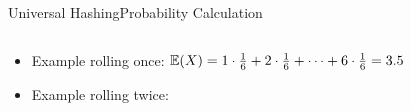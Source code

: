 \begin{frame}{Universal Hashing}{Probability Calculation}
\begin{columns}
\begin{column}{0.5\linewidth}
\begin{table}[!h]
   \end{table}
   \end{column}
 \end{columns}
 \begin{itemize}
 \vspace*{-1.0em}
 \item<4-> Example rolling once: 
  {\color{MainA}$\mathbb{E}(X) = 1 \cdot \frac{1}{6} + 2 \cdot \frac{1}{6}
    + \dots + 6 \cdot \frac{1}{6} = 3.5$}
 \item<6-> Example rolling twice: 
   \end{itemize}
\end{frame}





